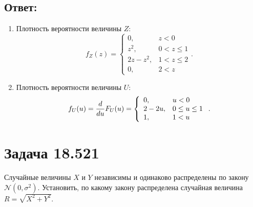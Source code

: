 \subsection*{Ответ:}
\begin{enumerate}
    \item Плотность вероятности величины $Z$:
    $$
    f_Z(z)
    = \left \{
    \begin{array}{ll}
        0,        & z < 0       \\
        z^2,      & 0 < z \le 1 \\
        2z - z^2, & 1 < z \le 2 \\
        0,        & 2 < z
    \end{array}
    \right .
    .
    $$

    \item Плотность вероятности величины $U$:
    $$
    f_U(u)
    = \frac{d}{du} F_U(u)
    = \left \{
    \begin{array}{ll}
        0,      & u < 0         \\
        2 - 2u, & 0 \le u \le 1 \\
        1,      & 1 < u
    \end{array}
    \right .
    .
    $$
\end{enumerate}

\section*{Задача 18.521}

Случайные величины $X$ и $Y$ независимы и одинаково распределены по закону $\mathcal{N}(0, \sigma^2)$. Установить, по какому закону распределена случайная величина
$R = \sqrt{X^2 + Y^2}$.
